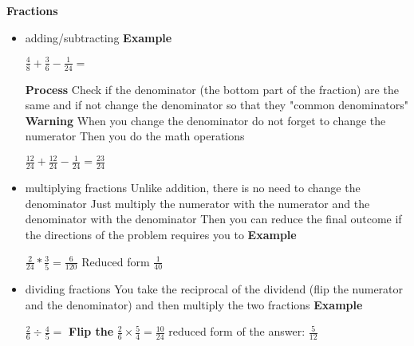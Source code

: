 \documentclass{article}
\begin{document}
\textbf{Fractions}
\begin{itemize}
    \item adding/subtracting \newline
    \textbf{Example}\newline 
    \begin{center}
    $
    \frac{4}{8}+\frac{3}{6}-\frac{1}{24}=
    $    
    \end{center}
    \textbf{Process} \newline 
    Check if the denominator (the bottom part of the fraction) are the same and 
    if not change the denominator so that they "common denominators" \newline
    \textbf{Warning}\newline 
    When you change the denominator do not forget to change the numerator \newline 
    Then you do the math operations 
    \begin{center}
    $
    \frac{12}{24}+\frac{12}{24}-\frac{1}{24}=\frac{23}{24}
    $
    \end{center}
    
    \item multiplying fractions \newline 
    Unlike addition, there is no need to change the denominator \newline 
    Just multiply the numerator with the numerator and the denominator with the denominator \newline 
    Then you can reduce the final outcome if the directions of the problem requires you to \newline 
    \textbf{Example} \newline 
    \begin{center}
    $
    \frac{2}{24}*\frac{3}{5}=\frac{6}{120}
    $
    Reduced form $ \frac{1}{40}$
    \end{center}
    \item dividing fractions 
    You take the reciprocal of the dividend (flip the numerator and the denominator) and then multiply the two fractions \newline 
    \textbf{Example} \newline 
    \begin{center}
    $
    \frac{2}{6} \div \frac{4}{5} = 
    $
    \newline 
    \textbf{Flip the } \newline 
    $
    \frac{2}{6} \times \frac{5}{4} = \frac{10}{24}
    $
    \newline 
    reduced form of the answer: $ \frac{5}{12}
    $
    \end{center}
\end{itemize}
\end{document}
